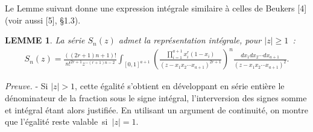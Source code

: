 \documentclass[11pt]{article}
\newcommand{\lm}{\left}
\newcommand{\rt}{\right}
\newtheorem{lem}{\rm LEMME}
\begin{document}
\noindent Le Lemme suivant donne une expression int\'egrale similaire \`a
celles de Beukers [4] (voir aussi [5], \S 1.3).
\begin{lem}
La s\'erie $S_{n}(z)$ admet la repr\'esentation int\'egrale,
pour $|z|\ge 1$~:
\begin{eqnarray*}
S_{n}(z)=\frac{((2r+1)n+1)!}{n!^{2r+1}z^{-(r+1)n-2}}
\int_{[0,1]^{a+1}}\lm(\frac{\prod_{i=1}^{a+1}x_i^{r}(1-x_i)}
{(z-x_1x_2\cdots x_{a+1})^{2r+1}}\rt)^n
\frac{dx_1dx_2\cdots dx_{a+1}}{(z-x_1x_2\cdots x_{a+1})^2}.
\end{eqnarray*}
\end{lem}
{\sl Preuve.} - Si $|z|>1$, cette \'egalit\'e s'obtient en d\'eveloppant en
s\'erie enti\`ere le \mbox{d\'enominateur} de la fraction sous le signe
int\'egral, l'interversion des signes  somme et int\'egral \'etant alors
justifi\'ee. En utilisant un argument de continuit\'e, on  montre que
l'\'egalit\'e reste \mbox{valable si $|z|=1$.}\\
\end{document}
